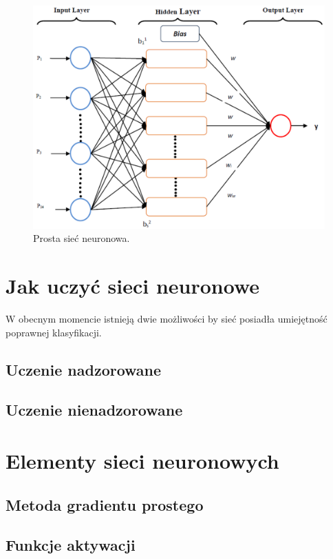 \documentclass[12pt,a4paper,twoside,titlepage,openright]{book}
\begin{document}
\begin{figure}[h]
	\centering
			\includegraphics[resolution=100]{SiecNeuronowa.png}
		\caption{Prosta sieć neuronowa.}
\end{figure}

\section{Jak uczyć sieci neuronowe}
W obecnym momencie istnieją dwie możliwości by sieć posiadła umiejętność poprawnej klasyfikacji. 

\subsection*{Uczenie nadzorowane}
\subsection*{Uczenie nienadzorowane}


\section{Elementy sieci neuronowych} 

\subsection{Metoda gradientu prostego}
\subsection{Funkcje aktywacji}
\end{document}
